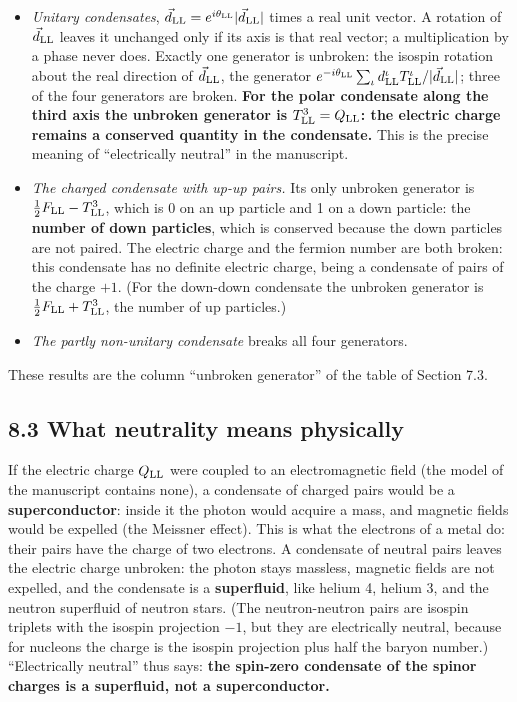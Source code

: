 \documentclass[
  10pt,
]{article}
\providecommand{\tightlist}{%
  \setlength{\itemsep}{0pt}\setlength{\parskip}{0pt}}
\begin{document}
\begin{itemize}
\tightlist
\item
  \emph{Unitary condensates},
  \(\vec d_{\rm LL}=e^{i\theta_{\rm LL}}\lvert\vec d_{\rm LL}\rvert\)
  times a real unit vector. A rotation of \(\vec d_{\rm LL}\) leaves it
  unchanged only if its axis is that real vector; a multiplication by a
  phase never does. Exactly one generator is unbroken: the isospin
  rotation about the real direction of \(\vec d_{\rm LL}\), the
  generator
  \(e^{-i\theta_{\rm LL}}\sum_\iota d^\iota_{\rm LL}T^\iota_{\rm LL}/\lvert\vec d_{\rm LL}\rvert\);
  three of the four generators are broken. \textbf{For the polar
  condensate along the third axis the unbroken generator is
  \(T^3_{\rm LL}=Q_{\rm LL}\): the electric charge remains a conserved
  quantity in the condensate.} This is the precise meaning of
  ``electrically neutral'' in the manuscript.
\item
  \emph{The charged condensate with up-up pairs.} Its only unbroken
  generator is \(\tfrac12F_{\rm LL}-T^3_{\rm LL}\), which is 0 on an up
  particle and 1 on a down particle: the \textbf{number of down
  particles}, which is conserved because the down particles are not
  paired. The electric charge and the fermion number are both broken:
  this condensate has no definite electric charge, being a condensate of
  pairs of the charge \(+1\). (For the down-down condensate the unbroken
  generator is \(\tfrac12F_{\rm LL}+T^3_{\rm LL}\), the number of up
  particles.)
\item
  \emph{The partly non-unitary condensate} breaks all four generators.
\end{itemize}

These results are the column ``unbroken generator'' of the table of
Section 7.3.

\hypertarget{what-neutrality-means-physically}{%
\subsection{8.3 What neutrality means
physically}\label{what-neutrality-means-physically}}

If the electric charge \(Q_{\rm LL}\) were coupled to an electromagnetic
field (the model of the manuscript contains none), a condensate of
charged pairs would be a \textbf{superconductor}: inside it the photon
would acquire a mass, and magnetic fields would be expelled (the
Meissner effect). This is what the electrons of a metal do: their pairs
have the charge of two electrons. A condensate of neutral pairs leaves
the electric charge unbroken: the photon stays massless, magnetic fields
are not expelled, and the condensate is a \textbf{superfluid}, like
helium 4, helium 3, and the neutron superfluid of neutron stars. (The
neutron-neutron pairs are isospin triplets with the isospin projection
\(-1\), but they are electrically neutral, because for nucleons the
charge is the isospin projection plus half the baryon number.)
``Electrically neutral'' thus says: \textbf{the spin-zero condensate of
the spinor charges is a superfluid, not a superconductor.}
\end{document}
